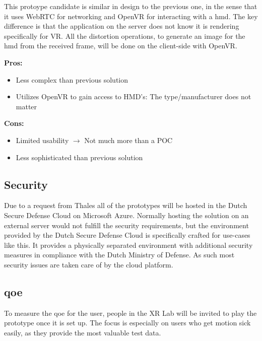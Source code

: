 This protoype candidate is similar in design to the previous one, in the sense that it uses WebRTC for networking and OpenVR for interacting with a \acrshort{hmd}. The key difference is that the application on the server does not know it is rendering specifically for VR. All the distortion operations, to generate an image for the \acrshort{hmd} from the received frame, will be done on the client-side with OpenVR. \\
\newline
\begin{varwidth}[t]{.5\textwidth}
\renewcommand\labelitemi{+}
\textbf{Pros:}
\begin{itemize}
\item Less complex than previous solution
\item Utilizes OpenVR to gain access to HMD's: The type/manufacturer does not matter
\end{itemize}
\end{varwidth}
\hspace{4em}
\begin{varwidth}[t]{.5\textwidth}
\renewcommand\labelitemi{-}
\textbf{Cons:}
\begin{itemize}
\item Limited usability $\rightarrow$
Not much more than a POC
\item Less sophisticated than previous solution
\end{itemize}
\end{varwidth}

\subsection{Security}

Due to a request from Thales all of the prototypes will be hosted in the Dutch Secure Defense Cloud on Microsoft Azure. Normally hosting the solution on an external server would not fulfill the security requirements, but the environment provided by the Dutch Secure Defense Cloud is specifically crafted for use-cases like this. It provides a physically separated environment with additional security measures in compliance with the Dutch Ministry of Defense. As such most security issues are taken care of by the cloud platform.

\subsection{\acrfull{qoe}}
To measure the \acrshort{qoe} for the user, people in the XR Lab will be invited to play the prototype once it is set up. The focus is especially on users who get motion sick easily, as they provide the most valuable test data.